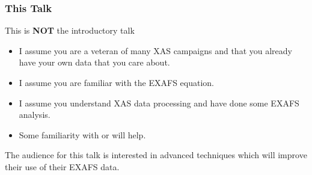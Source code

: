 \documentclass[10pt, xcolor=x11names, compress]{beamer}
\begin{document}
\begin{frame}
  \frametitle{This Talk}
  
  \begin{block}{This is \textbf{NOT} the introductory talk}
    \begin{itemize}
    \item I assume you are a veteran of many XAS campaigns and that
      you already have your own data that you care about.
    \item I assume you are familiar with the EXAFS equation.
    \item I assume you understand XAS data processing and have done
      some EXAFS analysis.
    \item Some familiarity with {\ifeffit} or {\artemis} will help.
    \end{itemize}
  \end{block}

  \bigskip

  \begin{alertblock}{}
    \begin{center}
      The audience for this talk is interested in advanced techniques
      which will improve their use of their EXAFS data.
    \end{center}
  \end{alertblock}
\end{frame}
\end{document}
